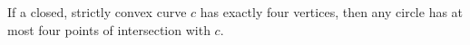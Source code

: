 If a closed, strictly convex curve $c$ has exactly four vertices, then any circle has at most four points of intersection with $c$.